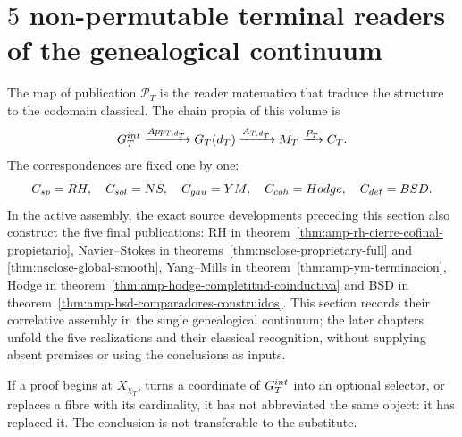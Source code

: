 \section{\(5\) non-permutable terminal readers of the genealogical continuum}

The map of publication $\mathcal P_T$ is the reader matematico that
traduce the structure to the codomain classical. The chain propia of this volume is
\begin{equation}\label{eq:pdf2-cinco-cadenas}
 \mathfrak G_T^{\rm int}\xrightarrow{\operatorname{App}_{T,d_T}}
 \mathfrak G_T(d_T)\xrightarrow{\mathcal A_{T,d_T}}\mathfrak M_T
 \xrightarrow{\mathcal P_T}\mathcal C_T.
\end{equation}
The correspondences are fixed one by one:
\[
 \mathcal C_{\rm sp}=\mathrm{RH},\quad
 \mathcal C_{\rm sol}=\mathrm{NS},\quad
 \mathcal C_{\rm gau}=\mathrm{YM},\quad
 \mathcal C_{\rm coh}=\mathrm{Hodge},\quad
 \mathcal C_{\rm det}=\mathrm{BSD}.
\]
In the active assembly, the exact source developments preceding this section also construct the five final publications: RH in theorem~\ref{thm:amp-rh-cierre-cofinal-propietario}, Navier--Stokes in theorems~\ref{thm:nsclose-proprietary-full} and \ref{thm:nsclose-global-smooth}, Yang--Mills in theorem~\ref{thm:amp-ym-terminacion}, Hodge in theorem~\ref{thm:amp-hodge-completitud-coinductiva} and BSD in theorem~\ref{thm:amp-bsd-comparadores-construidos}. This section records their correlative assembly in the single genealogical continuum; the later chapters unfold the five realizations and their classical recognition, without supplying absent premises or using the conclusions as inputs.

\begin{falsifier}
If a proof begins at $X_{\chi_T}$, turns a coordinate of
$\mathfrak G_T^{\rm int}$ into an optional selector, or replaces a fibre with its cardinality, it has not
abbreviated the same object: it has replaced it. The conclusion is not transferable to the
substitute.
\end{falsifier}
